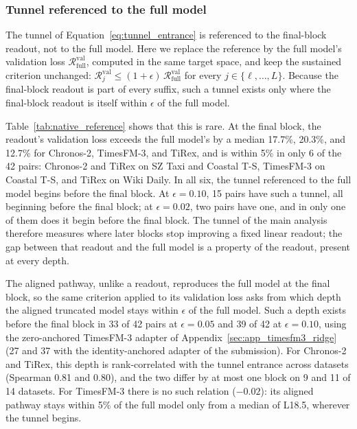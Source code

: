 
\subsubsection{Tunnel referenced to the full model}
\label{sec:app_native_reference}

The tunnel of Equation~\ref{eq:tunnel_entrance} is referenced to the final-block readout, not to the full model. Here we replace the reference by the full model's validation loss $\mathcal{R}^{\mathrm{val}}_{\mathrm{full}}$, computed in the same target space, and keep the sustained criterion unchanged: $\mathcal{R}^{\mathrm{val}}_{j}\le(1+\epsilon)\,\mathcal{R}^{\mathrm{val}}_{\mathrm{full}}$ for every $j\in\{\ell,\dots,L\}$. Because the final-block readout is part of every suffix, such a tunnel exists only where the final-block readout is itself within $\epsilon$ of the full model.

Table~\ref{tab:native_reference} shows that this is rare. At the final block, the readout's validation loss exceeds the full model's by a median 17.7\%, 20.3\%, and 12.7\% for Chronos-2, TimesFM-3, and TiRex, and is within 5\% in only 6 of the 42 pairs: Chronos-2 and TiRex on SZ Taxi and Coastal T-S, TimesFM-3 on Coastal T-S, and TiRex on Wiki Daily. In all six, the tunnel referenced to the full model begins before the final block. At $\epsilon=0.10$, 15 pairs have such a tunnel, all beginning before the final block; at $\epsilon=0.02$, two pairs have one, and in only one of them does it begin before the final block. The tunnel of the main analysis therefore measures where later blocks stop improving a fixed linear readout; the gap between that readout and the full model is a property of the readout, present at every depth.

The aligned pathway, unlike a readout, reproduces the full model at the final block, so the same criterion applied to its validation loss asks from which depth the aligned truncated model stays within $\epsilon$ of the full model. Such a depth exists before the final block in 33 of 42 pairs at $\epsilon=0.05$ and 39 of 42 at $\epsilon=0.10$, using the zero-anchored TimesFM-3 adapter of Appendix~\ref{sec:app_timesfm3_ridge} (27 and 37 with the identity-anchored adapter of the submission). For Chronos-2 and TiRex, this depth is rank-correlated with the tunnel entrance across datasets (Spearman 0.81 and 0.80), and the two differ by at most one block on 9 and 11 of 14 datasets. For TimesFM-3 there is no such relation ($-0.02$): its aligned pathway stays within 5\% of the full model only from a median of L18.5, wherever the tunnel begins.


